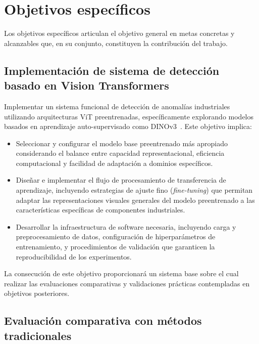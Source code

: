 \section{Objetivos específicos}

Los objetivos específicos articulan el objetivo general en metas concretas y alcanzables que, en su conjunto, constituyen la contribución del trabajo.

\subsection{Implementación de sistema de detección basado en Vision Transformers}

Implementar un sistema funcional de detección de anomalías industriales utilizando arquitecturas \acrlong{ViT} preentrenadas, específicamente explorando modelos basados en aprendizaje auto-supervisado como DINOv3~\cite{simeoni2025dinov3}. Este objetivo implica:

\begin{itemize}
    \item Seleccionar y configurar el modelo base preentrenado más apropiado considerando el balance entre capacidad representacional, eficiencia computacional y facilidad de adaptación a dominios específicos.
    
    \item Diseñar e implementar el flujo de procesamiento de transferencia de aprendizaje, incluyendo estrategias de ajuste fino (\textit{fine-tuning}) que permitan adaptar las representaciones visuales generales del modelo preentrenado a las características específicas de componentes industriales.
    
    \item Desarrollar la infraestructura de software necesaria, incluyendo carga y preprocesamiento de datos, configuración de hiperparámetros de entrenamiento, y procedimientos de validación que garanticen la reproducibilidad de los experimentos.
\end{itemize}

La consecución de este objetivo proporcionará un sistema base sobre el cual realizar las evaluaciones comparativas y validaciones prácticas contempladas en objetivos posteriores.

\subsection{Evaluación comparativa con métodos tradicionales}

